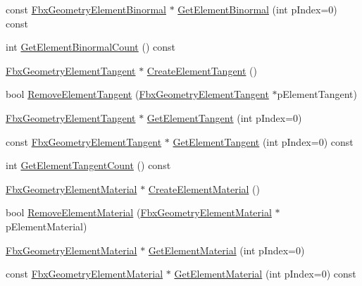 \begin{DoxyCompactItemize}
\item 
const \hyperlink{fbxlayer_8h_a066e30a64eb051458583b656a651e90b}{Fbx\+Geometry\+Element\+Binormal} $\ast$ \hyperlink{class_fbx_geometry_base_a12bc9aca7ec57790db96fa47219c559c}{Get\+Element\+Binormal} (int p\+Index=0) const
\item 
int \hyperlink{class_fbx_geometry_base_a04500774d4c9bfc97418f45aff63404e}{Get\+Element\+Binormal\+Count} () const
\item 
\hyperlink{fbxlayer_8h_a291cacd8b247483cc24704c8f49087a7}{Fbx\+Geometry\+Element\+Tangent} $\ast$ \hyperlink{class_fbx_geometry_base_a88790830df691da97b5f027a66d98eec}{Create\+Element\+Tangent} ()
\item 
bool \hyperlink{class_fbx_geometry_base_a9289899568d50f8b60c3a33761c92446}{Remove\+Element\+Tangent} (\hyperlink{fbxlayer_8h_a291cacd8b247483cc24704c8f49087a7}{Fbx\+Geometry\+Element\+Tangent} $\ast$p\+Element\+Tangent)
\item 
\hyperlink{fbxlayer_8h_a291cacd8b247483cc24704c8f49087a7}{Fbx\+Geometry\+Element\+Tangent} $\ast$ \hyperlink{class_fbx_geometry_base_a28cf260152f84ce031a3d2844b9895cc}{Get\+Element\+Tangent} (int p\+Index=0)
\item 
const \hyperlink{fbxlayer_8h_a291cacd8b247483cc24704c8f49087a7}{Fbx\+Geometry\+Element\+Tangent} $\ast$ \hyperlink{class_fbx_geometry_base_a5fedf8c0a50736da2fa590cf1b922506}{Get\+Element\+Tangent} (int p\+Index=0) const
\item 
int \hyperlink{class_fbx_geometry_base_ac7a775211507bd51dd804d8e013f625c}{Get\+Element\+Tangent\+Count} () const
\item 
\hyperlink{fbxlayer_8h_a1a779f3f614dbf0024c07f4a1d8332f4}{Fbx\+Geometry\+Element\+Material} $\ast$ \hyperlink{class_fbx_geometry_base_a1c93bffeaa9af18fd7ab9c2eb68ca4ec}{Create\+Element\+Material} ()
\item 
bool \hyperlink{class_fbx_geometry_base_a396c0e3be695dbca3724be1e47e9f7cb}{Remove\+Element\+Material} (\hyperlink{fbxlayer_8h_a1a779f3f614dbf0024c07f4a1d8332f4}{Fbx\+Geometry\+Element\+Material} $\ast$p\+Element\+Material)
\item 
\hyperlink{fbxlayer_8h_a1a779f3f614dbf0024c07f4a1d8332f4}{Fbx\+Geometry\+Element\+Material} $\ast$ \hyperlink{class_fbx_geometry_base_ac49c730d0f134f1aff416bc4be5ca4e5}{Get\+Element\+Material} (int p\+Index=0)
\item 
const \hyperlink{fbxlayer_8h_a1a779f3f614dbf0024c07f4a1d8332f4}{Fbx\+Geometry\+Element\+Material} $\ast$ \hyperlink{class_fbx_geometry_base_acd0f6cd7ecaa99d15aab3e211857f462}{Get\+Element\+Material} (int p\+Index=0) const

\end{DoxyCompactItemize}
